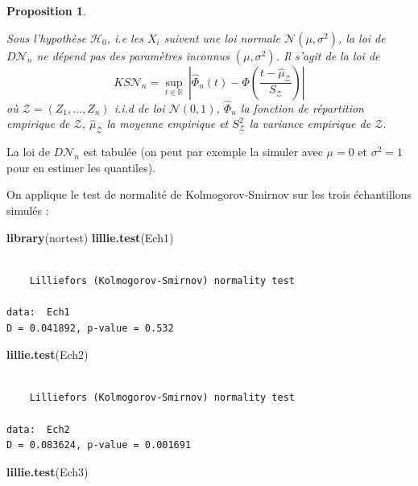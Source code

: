 \documentclass[
]{book}
\newenvironment{Shaded}{\begin{snugshade}}{\end{snugshade}}
\newcommand{\KeywordTok}[1]{\textcolor[rgb]{0.13,0.29,0.53}{\textbf{#1}}}
\newcommand{\NormalTok}[1]{#1}
\newtheorem{proposition}{Proposition}[chapter]
\theoremstyle{definition}
\theoremstyle{definition}
\theoremstyle{definition}
\theoremstyle{definition}
\theoremstyle{remark}
\begin{document}
\begin{proposition}
\protect\hypertarget{prp:unlabeled-div-39}{}\label{prp:unlabeled-div-39}

Sous l'hypothèse \(\mathcal{H}_0\), i.e les \(X_i\) suivent une loi normale \(\mathcal{N}(\mu, \sigma^2)\), la loi de \(D\mathcal{N}_n\) ne dépend pas des paramètres inconnus \((\mu, \sigma^2)\). Il s'agit de la loi de
\[
KS\mathcal{N}_n = \underset{t\in\mathbb{R}}{\sup}\ \left|  \hat{\Phi}_n(t) - \Phi\left(\frac{t - \hat\mu_{\mathcal{Z}}}{S_{\mathcal{Z}}}\right)  \right|
\]
où \(\mathcal{Z}=(Z_1,\ldots,Z_n)\) i.i.d de loi \(\mathcal{N}(0,1)\), \(\hat\Phi_n\) la fonction de répartition empirique de \(\mathcal{Z}\), \(\hat\mu_{\mathcal{Z}}\) la moyenne empirique et \(S^2_{\mathcal{Z}}\) la variance empirique de \(\mathcal{Z}\).

\end{proposition}

La loi de \(D\mathcal{N}_n\) est tabulée (on peut par exemple la simuler avec \(\mu=0\) et \(\sigma^2=1\) pour en estimer les quantiles).

On applique le test de normalité de Kolmogorov-Smirnov sur les trois échantillons simulés :

\begin{Shaded}
\begin{Highlighting}[]
\KeywordTok{library}\NormalTok{(nortest)}
\KeywordTok{lillie.test}\NormalTok{(Ech1)}
\end{Highlighting}
\end{Shaded}

\begin{verbatim}

    Lilliefors (Kolmogorov-Smirnov) normality test

data:  Ech1
D = 0.041892, p-value = 0.532
\end{verbatim}

\begin{Shaded}
\begin{Highlighting}[]
\KeywordTok{lillie.test}\NormalTok{(Ech2)}
\end{Highlighting}
\end{Shaded}

\begin{verbatim}

    Lilliefors (Kolmogorov-Smirnov) normality test

data:  Ech2
D = 0.083624, p-value = 0.001691
\end{verbatim}

\begin{Shaded}
\begin{Highlighting}[]
\KeywordTok{lillie.test}\NormalTok{(Ech3)}
\end{Highlighting}
\end{Shaded}
\end{document}
